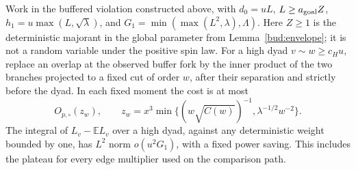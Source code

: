 \begin{lemma}\label{bud:high-primitive}
Work in the buffered violation constructed above, with
\(d_0=uL\), \(L\ge a_{\rm goal}Z\),
\(h_1=u\max(L,\sqrt\lambda)\), and
\(G_1=\min(\max(L^2,\lambda),\Lambda)\).
Here \(Z\ge1\) is the deterministic majorant in the global parameter
from Lemma~\ref{bud:envelope}; it is not a random variable under the
positive spin law. For a high dyad \(v\sim w\ge c_Hu\), replace an
overlap at the observed buffer fork by the inner product of the two
branches projected to a fixed cut of order \(w\), after their
separation and strictly before the dyad. In each fixed moment the cost
is at most
\[
 O_{p,\circ}(z_w),\qquad z_w=x^3\min\{(w\sqrt{C(w)})^{-1},\lambda^{-1/2}w^{-2}\}.
                                                                    \tag{C17}\label{eq:C17}
\]
The integral of \(L_v-\mathbb EL_v\) over a high dyad, against any
deterministic weight bounded by one, has \(L^2\) norm
\(o(u^2G_1)\), with a fixed power saving. This includes the plateau
for every edge multiplier used on the comparison path.
\end{lemma}

